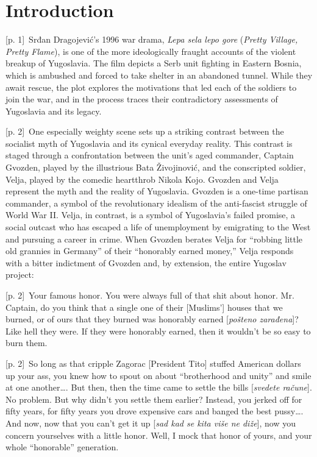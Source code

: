 \documentclass[10pt,a4paper]{article}
\begin{document}
\section*{Introduction}
{\scriptsize\color{gray} [p. 1]}\ Srđan Dragojević’s 1996 war drama, \textit{Lepa sela lepo gore} (\textit{Pretty Village, Pretty Flame}), is one of the more ideologically fraught accounts of the violent breakup of Yugoslavia. The film depicts a Serb unit fighting in Eastern Bosnia, which is ambushed and forced to take shelter in an abandoned tunnel. While they await rescue, the plot explores the motivations that led each of the soldiers to join the war, and in the process traces their contradictory assessments of Yugoslavia and its legacy.\par
{\scriptsize\color{gray} [p. 2]}\ One especially weighty scene sets up a striking contrast between the socialist myth of Yugoslavia and its cynical everyday reality. This contrast is staged through a confrontation between the unit’s aged commander, Captain Gvozden, played by the illustrious Bata Živojinović, and the conscripted soldier, Velja, played by the comedic heartthrob Nikola Kojo. Gvozden and Velja represent the myth and the reality of Yugoslavia. Gvozden is a one-time partisan commander, a symbol of the revolutionary idealism of the anti-fascist struggle of World War II. Velja, in contrast, is a symbol of Yugoslavia’s failed promise, a social outcast who has escaped a life of unemployment by emigrating to the West and pursuing a career in crime. When Gvozden berates Velja for “robbing little old grannies in Germany” of their “honorably earned money,” Velja responds with a bitter indictment of Gvozden and, by extension, the entire Yugoslav project:\par
{\scriptsize\color{gray} [p. 2]}\ Your famous honor. You were always full of that shit about honor. Mr. Captain, do you think that a single one of their [Muslims’] houses that we burned, or of ours that they burned was honorably earned [\textit{pošteno zarađena}]? Like hell they were. If they were honorably earned, then it wouldn’t be so easy to burn them.\par
{\scriptsize\color{gray} [p. 2]}\ So long as that cripple Zagorac [President Tito] stuffed American dollars up your ass, you knew how to spout on about “brotherhood and unity” and smile at one another…. But then, then the time came to settle the bills [\textit{svedete račune}]. No problem. But why didn’t you settle them earlier? Instead, you jerked off for fifty years, for fifty years you drove expensive cars and banged the best pussy…. And now, now that you can’t get it up [\textit{sad kad se kita više ne diže}], now you concern yourselves with a little honor. Well, I mock that honor of yours, and your whole “honorable” generation.\par
\end{document}
